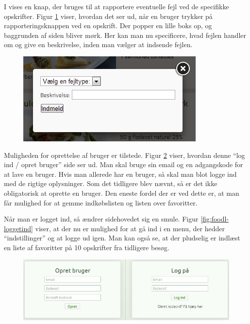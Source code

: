 I  vises en knap, der bruges til at rapportere eventuelle fejl ved de specifikke opskrifter. Figur \ref{fig:foodl-fejlrapportering} viser, hvordan det ser ud, når en bruger trykker på rapporteringsknappen ved en opskrift. Der popper en lille boks op, og baggrunden af siden bliver mørk. Her kan man nu specificere, hvad fejlen handler om og give en beskrivelse, inden man vælger at indsende fejlen.

\begin{figure}[H]
	\centering
	\includegraphics[scale=0.7]{billeder/foodl/fejlrapportering.jpg}
	\label{fig:foodl-fejlrapportering}
\end{figure}

Muligheden for oprettelse af bruger er tilstede. Figur \ref{fig:foodl-opret} viser, hvordan denne ``log ind / opret bruger'' side ser ud. Man skal bruge sin email og en adgangskode for at lave en bruger. Hvis man allerede har en bruger, så skal man blot logge ind med de rigtige oplysninger. Som det tidligere blev nævnt, så er det ikke obligatorisk at oprette en bruger. Den eneste fordel der er ved dette er, at man får mulighed for at gemme indkøbslisten og listen over favoritter. 

Når man er logget ind, så ændrer sidehovedet sig en smule. Figur \ref{fig:foodl-loggetind} viser, at der nu er mulighed for at gå ind i en menu, der hedder ``indstillinger'' og at logge ud igen. Man kan også se, at der pludselig er indlæst en liste af favoritter på 10 opskrifter fra tidligere besøg.

\begin{figure}[H]
	\centering
	\includegraphics[scale=0.7]{billeder/foodl/login-opret.jpg}
	\label{fig:foodl-opret}
\end{figure}

